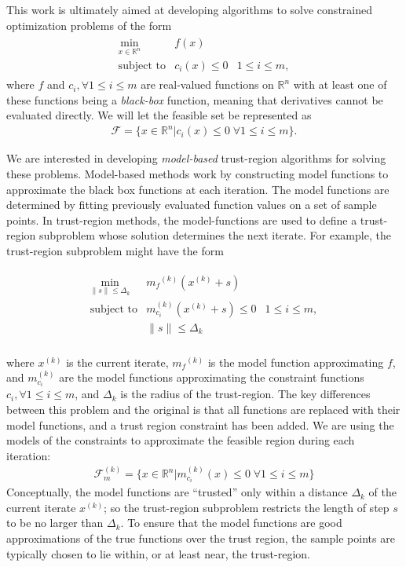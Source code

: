 \documentclass{article}
\theoremstyle{case}
\numberwithin{theorem}{subsection}
\newcommand{\dk}{\Delta_k}
\newcommand{\feasiblek}{{\mathcal F_m^{(k)}}}
\newcommand{\feasible}{{\mathcal F}}
\newcommand{\mcik}{{{m}^{(k)}_{c_i}}}
\newcommand{\mfk}{{{m}_f}^{(k)}}
\newcommand{\Rn}{\mathbb R^n}
\newcommand{\xk}{x^{(k)}}
\begin{document}
This work is ultimately aimed at developing algorithms to solve constrained optimization problems of the form 
\begin{align*}
\begin{array}{ccl} \min_{x \in \Rn} & f(x) \\
\mbox{subject to} & c_i(x) \le 0 & 1 \le i \le m,
\end{array}
\end{align*}
where 
$f$ and $c_i, \forall 1 \le i \le m$ are real-valued functions on $\Rn$ with at least one of these functions being a {\em black-box} function, meaning that derivatives cannot be evaluated directly.
We will let the feasible set be represented as 
\begin{align}
\feasible = \{x \in \Rn | c_i(x) \le 0 \; \forall 1 \le i \le m \}. \label{define_feasible}
\end{align}

We are interested in developing {\em model-based} trust-region algorithms for solving these problems.
Model-based methods work by constructing model functions to approximate the black box functions at each iteration.
The model functions are determined by fitting previously evaluated function values on a set of sample points.
In trust-region methods, the model-functions are used to define a trust-region subproblem whose solution determines the next iterate.
For example, the trust-region subproblem might have the form

\begin{align*}
\begin{array}{ccl} \min_{\|s\| \le \dk}
 & \mfk \left(\xk+s\right) \\
\mbox{subject to} & \mcik\left(\xk + s\right) \le 0 & 1 \le i \le m, \\
& \|s\| \le \dk \\
\end{array}
\end{align*}

where $\xk$ is the current iterate, $\mfk$ is the model function approximating $f$, 
and $\mcik$ are the model functions approximating the constraint functions $c_i, \forall 1 \le i \le m$, and $\dk$ is the radius of the trust-region.
The key differences between this problem and the original is that all functions are replaced with their model functions, and a trust region constraint has been added.
We are using the models of the constraints to approximate the feasible region during each iteration:
\begin{align}
\feasiblek = \{x \in \Rn | \mcik(x) \le 0 \; \forall 1 \le i \le m \} \label{define_feasiblek}
\end{align}
Conceptually, the model functions are ``trusted'' only within a distance $ \dk $ of the current iterate $\xk$; so the trust-region subproblem restricts the length of step $s$ to be no larger than $\dk$.
To ensure that the model functions are good approximations of the true functions over the trust region, the sample points are typically chosen to lie within, or at least near, the trust-region.
\end{document}
